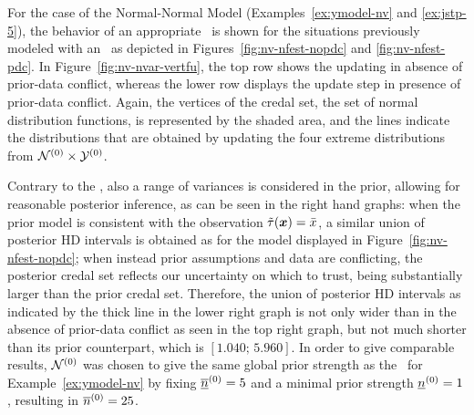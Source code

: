 \begin{example}
\label{ex:jstp-7}
For the case of the Normal-Normal Model (Examples~\ref{ex:ymodel-nv} and \ref{ex:jstp-5}),
the behavior of an appropriate \nymodel\ is shown for the situations previously
modeled with an \ymodel\ as depicted in
Figures~\ref{fig:nv-nfest-nopdc} and \ref{fig:nv-nfest-pdc}. In
Figure~\ref{fig:nv-nvar-vertfu}, the top row shows the updating in
absence of prior-data conflict, whereas the lower row displays
the update step in presence of prior-data conflict.
Again, the vertices of the credal set, the set of normal
distribution functions, is represented by the shaded area,
and the lines indicate the distributions that are obtained by updating the four
extreme distributions from $\mathcal{N}^{(0)} \times \mathcal{Y}^{(0)}$.

Contrary to the \ymodel, also a range of variances is considered in the
prior, allowing for reasonable posterior inference, as can be seen
in the right hand graphs: when the prior model is consistent with
the observation $\tilde{\tau}({\bm x}) = \bar{x}$, a similar union of posterior HD
intervals is obtained as for the model displayed in
Figure~\ref{fig:nv-nfest-nopdc}; when instead prior assumptions and
data are conflicting, the posterior credal set reflects our
uncertainty on which to trust, being substantially larger than the
prior credal set. Therefore, the union of posterior HD intervals as
indicated by the thick line in the lower right graph is not only
wider than in the absence of prior-data conflict as seen in the top
right graph, but not much shorter than its prior counterpart, which is $[1.040;\, 5.960]$.
In order to give comparable results, $\mathcal{N}^{(0)}$ was chosen to give the same global prior strength as the
\ymodel\ for Example~\ref{ex:ymodel-nv} by fixing $\underline{\overline{n}}^{(0)}=5$ and a minimal prior strength
$\underline{n}^{(0)} = 1$, resulting in $\overline{n}^{(0)} = 25$.
\end{example}

